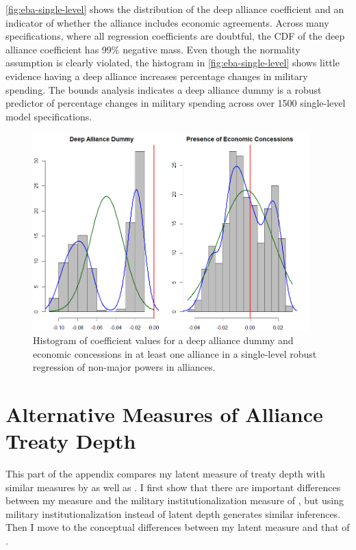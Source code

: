 \documentclass[12pt]{article}
\begin{document}
\autoref{fig:eba-single-level} shows the distribution of the deep alliance coefficient and an indicator of whether the alliance includes economic agreements. 
Across many specifications, where all regression coefficients are doubtful, the CDF of the deep alliance coefficient has 99\% negative mass. 
Even though the normality assumption is clearly violated, the histogram in \autoref{fig:eba-single-level} shows little evidence having a deep alliance increases percentage changes in military spending. 
The bounds analysis indicates a deep alliance dummy is a robust predictor of percentage changes in military spending across over 1500 single-level model specifications. 


\begin{figure}[htbp]
	\centering
		\includegraphics[width=0.95\textwidth]{eba-single-level.png}
	\caption{Histogram of coefficient values for a deep alliance dummy and economic concessions in at least one alliance in a single-level robust regression of non-major powers in alliances.}
	\label{fig:eba-single-level}
\end{figure}




\section{Alternative Measures of Alliance Treaty Depth}

This part of the appendix compares my latent measure of treaty depth with similar measures by \citet{LeedsAnac2005} as well as \citet{BensonClinton2016}. 
I first show that there are important differences between my measure and the military institutionalization measure of \citet{LeedsAnac2005}, but using military institutionalization instead of latent depth generates similar inferences. 
Then I move to the conceptual differences between my latent measure and that of \citet{BensonClinton2016}.
\end{document}
